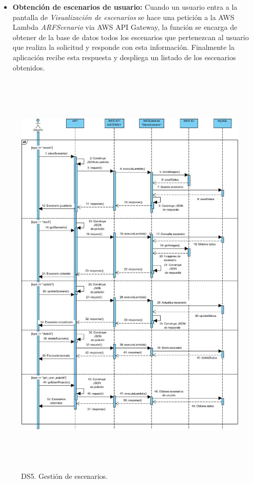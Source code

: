 \begin{itemize}
	\item \textbf{Obtención de escenarios de usuario:} Cuando un usuario entra a la pantalla de \textit{Visualización de escenarios} se hace una petición a la AWS Lambda \textit{ARFScenario} via AWS API Gateway, la función se encarga de obtener de la base de datos todos los escenarios que pertenezcan al usuario que realiza la solicitud y responde con esta información. Finalmente la aplicación recibe esta respuesta y despliega un listado de los escenarios obtenidos.
\end{itemize}

\begin{figure}[h!]
	\centering
	\includegraphics[width=14cm,height=20cm]{imagenes/analisis/ds/CrearEscenario.jpg}
	\caption{DS5. Gestión de escenarios.}
	\label{fig:dsreccuenta}
\end{figure}
\clearpage